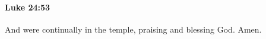 		\paragraph{Luke 24:53} %
			\label{LUKE-24-53}

			And were continually in the temple, praising and blessing God. Amen.

			\begin{framed}
			\scriptsize
				\begin{compactdesc}
					\item[SBLG] 
				\end{compactdesc}
			\end{framed}